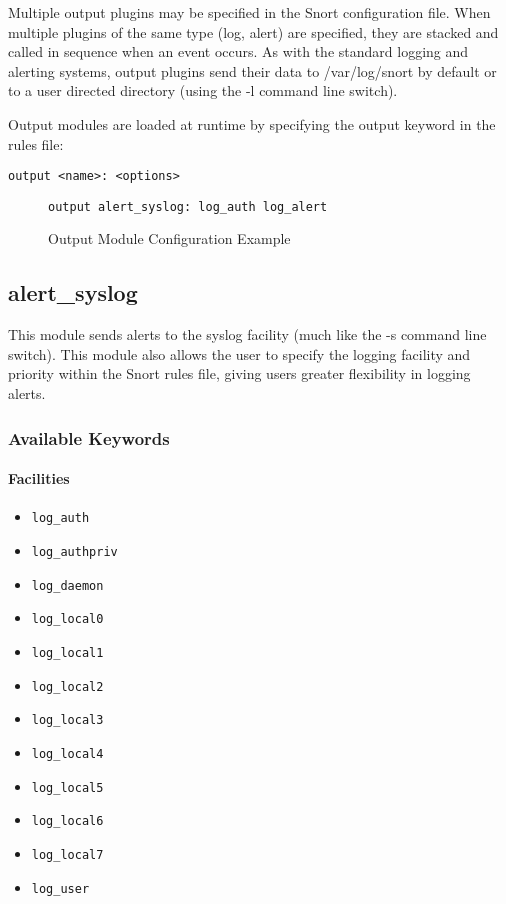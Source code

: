 \documentclass[english]{report}
\begin{document}
Multiple output plugins may be specified in the Snort configuration
file. When multiple plugins of the same type (log, alert) are specified,
they are stacked and called in sequence when an
event occurs. As with the standard logging and alerting systems, output
plugins send their data to /var/log/snort by default or to a user
directed directory (using the -l command line
switch).

Output modules are loaded at runtime by specifying the output keyword
in the rules file:

\begin{verbatim}
output <name>: <options>
\end{verbatim}

\begin{figure}[!hbpt]
\begin{verbatim}
output alert_syslog: log_auth log_alert
\end{verbatim}

\caption{\label{output config example}Output Module Configuration Example}
\end{figure}

\subsection{alert\_syslog \label{alert syslog lable}}

This module sends alerts to the syslog facility (much like the -s
command line switch). This module also allows the user to specify
the logging facility and priority within the Snort rules file, giving
users greater flexibility in logging alerts.

\subsubsection{Available Keywords}


\paragraph{Facilities}

\begin{itemize}
\item \texttt{log\_auth} 
\item \texttt{log\_authpriv} 
\item \texttt{log\_daemon}
\item \texttt{log\_local0} 
\item \texttt{log\_local1}
\item \texttt{log\_local2}
\item \texttt{log\_local3}
\item \texttt{log\_local4}
\item \texttt{log\_local5}
\item \texttt{log\_local6}
\item \texttt{log\_local7}
\item \texttt{log\_user}
\end{itemize}
\end{document}

